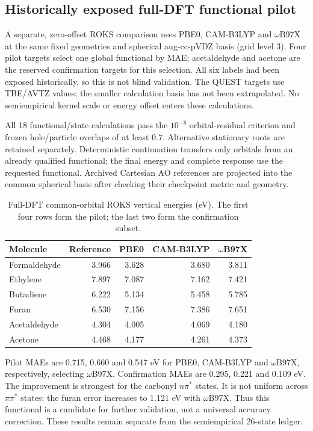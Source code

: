 \clearpage
\subsection{Historically exposed full-DFT functional pilot}
A separate, zero-offset ROKS comparison uses PBE0, CAM-B3LYP and
$\omega$B97X\cite{Chai2008WB97X} at the same fixed geometries and spherical
aug-cc-pVDZ basis (grid level 3). Four pilot targets select one global
functional by MAE; acetaldehyde and acetone are the reserved confirmation
targets for this selection. All six labels had been exposed historically,
so this is not blind validation. The QUEST targets use TBE/AVTZ values;
the smaller calculation basis has not been extrapolated. No semiempirical
kernel scale or energy offset enters these calculations.

All 18 functional/state calculations pass the $10^{-8}$ orbital-residual
criterion and frozen hole/particle overlaps of at least 0.7. Alternative
stationary roots are retained separately. Deterministic continuation
transfers only orbitals from an already qualified functional; the final
energy and complete response use the requested functional. Archived
Cartesian AO references are projected into the common spherical basis
after checking their checkpoint metric and geometry.

\begin{table}[htbp]
\centering\small
\caption{Full-DFT common-orbital ROKS vertical energies (eV). The first four
rows form the pilot; the last two form the confirmation subset.}
\begin{tabular}{lrrrr}
\toprule
Molecule & Reference & PBE0 & CAM-B3LYP & $\omega$B97X \\
\midrule
Formaldehyde & 3.966 & 3.628 & 3.680 & 3.811 \\
Ethylene & 7.897 & 7.087 & 7.162 & 7.421 \\
Butadiene & 6.222 & 5.134 & 5.458 & 5.785 \\
Furan & 6.530 & 7.156 & 7.386 & 7.651 \\
Acetaldehyde & 4.304 & 4.005 & 4.069 & 4.180 \\
Acetone & 4.468 & 4.177 & 4.261 & 4.373 \\
\bottomrule
\end{tabular}
\end{table}

Pilot MAEs are 0.715, 0.660 and 0.547 eV for PBE0, CAM-B3LYP and
$\omega$B97X, respectively, selecting $\omega$B97X. Confirmation MAEs are
0.295, 0.221 and 0.109 eV. The improvement is strongest for the carbonyl
$n\pi^*$ states. It is not uniform across $\pi\pi^*$ states: the furan
error increases to 1.121 eV with $\omega$B97X. Thus this functional is a
candidate for further validation, not a universal accuracy correction.
These results remain separate from the semiempirical 26-state ledger.

